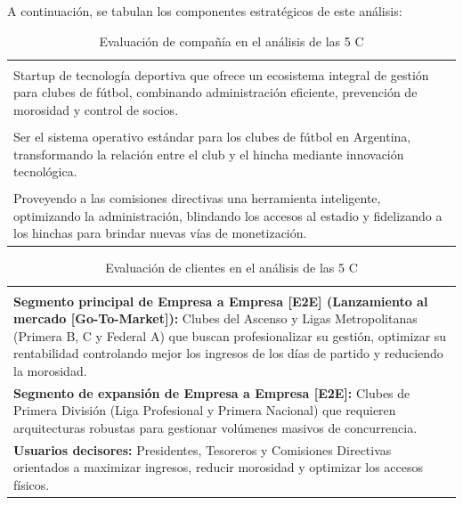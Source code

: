 A continuación, se tabulan los componentes estratégicos de este análisis:

\begin{table}[h!]
\centering
\renewcommand{\arraystretch}{1.5}
\begin{tabularx}{\textwidth}{|X|}
\hline
\rowcolor{blue!20} \multicolumn{1}{|c|}{\textbf{COMPAÑÍA}} \\ \hline
\rowcolor{blue!10} \multicolumn{1}{|c|}{\textbf{Descripción}} \\ \hline
Startup de tecnología deportiva que ofrece un ecosistema integral de gestión para clubes de fútbol, combinando administración eficiente, prevención de morosidad y control de socios. \\ \hline
\rowcolor{blue!10} \multicolumn{1}{|c|}{\textbf{Visión}} \\ \hline
Ser el sistema operativo estándar para los clubes de fútbol en Argentina, transformando la relación entre el club y el hincha mediante innovación tecnológica. \\ \hline
\rowcolor{blue!10} \multicolumn{1}{|c|}{\textbf{Misión}} \\ \hline
Proveyendo a las comisiones directivas una herramienta inteligente, optimizando la administración, blindando los accesos al estadio y fidelizando a los hinchas para brindar nuevas vías de monetización. \\ \hline
\end{tabularx}
\caption{Evaluación de compañía en el análisis de las 5 C}
\end{table}

\begin{table}[h!]
\centering
\renewcommand{\arraystretch}{1.5}
\begin{tabularx}{\textwidth}{|X|}
\hline
\rowcolor{cyan!20} \multicolumn{1}{|c|}{\textbf{CLIENTES}} \\ \hline
\rowcolor{cyan!10} \multicolumn{1}{|c|}{\textbf{Segmentos objetivos}} \\ \hline
\textbf{Segmento principal de Empresa a Empresa [E2E] (Lanzamiento al mercado [Go-To-Market]):} Clubes del Ascenso y Ligas Metropolitanas (Primera B, C y Federal A) que buscan profesionalizar su gestión, optimizar su rentabilidad controlando mejor los ingresos de los días de partido y reduciendo la morosidad. \\
\textbf{Segmento de expansión de Empresa a Empresa [E2E]:} Clubes de Primera División (Liga Profesional y Primera Nacional) que requieren arquitecturas robustas para gestionar volúmenes masivos de concurrencia. \\
\textbf{Usuarios decisores:} Presidentes, Tesoreros y Comisiones Directivas orientados a maximizar ingresos, reducir morosidad y optimizar los accesos físicos. \\ \hline
\end{tabularx}
\caption{Evaluación de clientes en el análisis de las 5 C}
\end{table}

